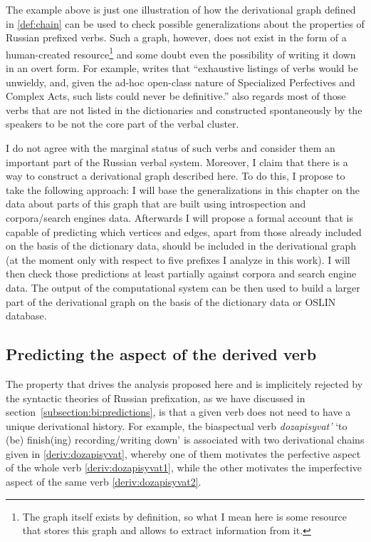 The example above is just one illustration of how the derivational graph defined in \ref{def:chain} can be used to check possible generalizations about the properties of Russian prefixed verbs. Such a graph, however, does not exist in the form of a human-created resource\footnote{The graph itself exists by definition, so what I mean here is some resource that stores this graph and allows to extract information from it.} and some doubt even the possibility of writing it down in an overt form. For example, \citet[625]{Janda:07a} writes that ``exhaustive listings of verbs would be unwieldy, and, given the ad-hoc open-class nature of Specialized Perfectives and Complex Acts, such lists could never be definitive.'' \citet[626]{Janda:07a} also regards most of those verbs that are not listed in the dictionaries and constructed spontaneously by the speakers to be not the core part of the verbal cluster. 

I do not agree with the marginal status of such verbs and consider them an important part of the Russian verbal system. Moreover, I claim that there is a way to construct a derivational graph described here. To do this, I propose to take the following approach: I will base the generalizations in this chapter on the data about parts of this graph that are built using introspection and corpora/search engines data. Afterwards I will propose a formal account that is capable of predicting which vertices and edges, apart from those already included on the basis of the dictionary data, should be included in the derivational graph (at the moment only with respect to five prefixes I analyze in this work). I will then check those predictions at least partially against corpora and search engine data. The output of the computational system can be then used to build a larger part of the derivational graph on the basis of the dictionary data or OSLIN database.

\subsection{Predicting the aspect of the derived verb}
The property that drives the analysis proposed here and is implicitely rejected by the syntactic theories of Russian prefixation, as we have discussed in section~\ref{subsection:bi:predictions}, is that a given verb does not need to have a unique derivational history. For example, the biaspectual verb \textit{dozapisyvat'} `to (be) finish(ing) recording/writing down' is associated with two derivational chains given in \ref{deriv:dozapisyvat}, whereby one of them motivates the perfective aspect of the whole verb \ref{deriv:dozapisyvat1}, while the other motivates the imperfective aspect of the same verb \ref{deriv:dozapisyvat2}.

